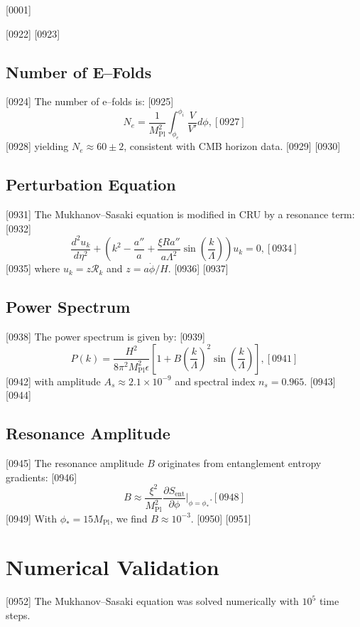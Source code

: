 [0001] \documentclass[12pt]{report}
[0002] \usepackage[utf8]{inputenc}
\begin{document}
[0922] 
[0923] \subsection{Number of E–Folds}
[0924] The number of e–folds is:
[0925] \begin{equation}
[0926] N_e = \frac{1}{M_{\text{Pl}}^2} \int_{\phi_e}^{\phi_i} \frac{V}{V'} d\phi,
[0927] \end{equation}
[0928] yielding $N_e \approx 60 \pm 2$, consistent with CMB horizon data.  
[0929] 
[0930] \subsection{Perturbation Equation}
[0931] The Mukhanov–Sasaki equation is modified in CRU by a resonance term:
[0932] \begin{equation}
[0933] \frac{d^2 u_k}{d\eta^2} + 
\left( k^2 - \frac{a''}{a} + \frac{\xi R a''}{a \Lambda^2} \sin\!\left(\frac{k}{\Lambda}\right) \right) u_k = 0,
[0934] \end{equation}
[0935] where $u_k = z \mathcal{R}_k$ and $z = a \dot{\phi}/H$.  
[0936] 
[0937] \subsection{Power Spectrum}
[0938] The power spectrum is given by:
[0939] \begin{equation}
[0940] P(k) = \frac{H^2}{8 \pi^2 M_{\text{Pl}}^2 \epsilon} 
\left[ 1 + B \left(\frac{k}{\Lambda}\right)^2 \sin\!\left(\frac{k}{\Lambda}\right) \right],
[0941] \end{equation}
[0942] with amplitude $A_s \approx 2.1 \times 10^{-9}$ and spectral index $n_s = 0.965$.  
[0943] 
[0944] \subsection{Resonance Amplitude}
[0945] The resonance amplitude $B$ originates from entanglement entropy gradients:
[0946] \begin{equation}
[0947] B \approx \frac{\xi^2}{M_{\text{Pl}}^2} 
\frac{\partial S_{\text{ent}}}{\partial \phi}\Big|_{\phi = \phi_*}.
[0948] \end{equation}
[0949] With $\phi_* = 15 M_{\text{Pl}}$, we find $B \approx 10^{-3}$.  
[0950] 
[0951] \section{Numerical Validation}
[0952] The Mukhanov–Sasaki equation was solved numerically with $10^5$ time steps.  
\end{document}
